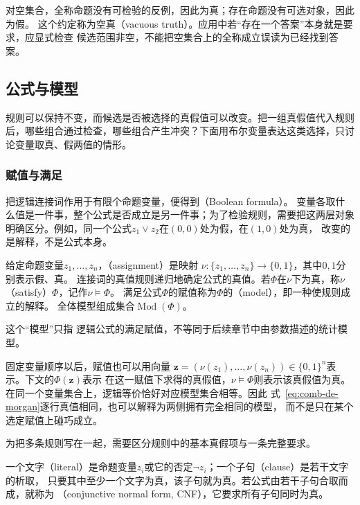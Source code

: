 对空集合，全称命题没有可检验的反例，因此为真；存在命题没有可选对象，因此为假。
这个约定称为空真（vacuous truth）。应用中若“存在一个答案”本身就是要求，应显式检查
候选范围非空，不能把空集合上的全称成立误读为已经找到答案。

\subsection{公式与模型}
\label{sec:prelim-formulas-models}

规则可以保持不变，而候选是否被选择的真假值可以改变。把一组真假值代入规则后，哪些组合通过检查，哪些组合产生冲突？下面用布尔变量表达这类选择，只讨论变量取真、假两值的情形。

\subsubsection{赋值与满足}
\label{sec:prelim-assignment-satisfaction}

把逻辑连接词作用于有限个命题变量，便得到（Boolean formula）。
变量各取什么值是一件事，整个公式是否成立是另一件事；为了检验规则，需要把这两层对象
明确区分。例如，同一个公式$z_1\lor z_2$在$(0,0)$处为假，在$(1,0)$处为真，
改变的是解释，不是公式本身。

\begin{definition}[赋值与公式的模型]
\label{def:comb-assignment-model}
给定命题变量$z_1,\ldots,z_n$，（assignment）是映射
$\nu:\{z_1,\ldots,z_n\}\to\{0,1\}$，其中$0,1$分别表示假、真。
连接词的真值规则递归地确定公式的真值。若$\Phi$在$\nu$下为真，称$\nu$
（satisfy）$\Phi$，记作$\nu\models\Phi$。
满足公式$\Phi$的赋值称为$\Phi$的（model），即一种使规则成立的解释。
全体模型组成集合$\operatorname{Mod}(\Phi)$。
\end{definition}
这个“模型”只指
逻辑公式的满足赋值，不等同于后续章节中由参数描述的统计模型。

固定变量顺序以后，赋值也可以用向量
$\bm{z}=(\nu(z_1),\ldots,\nu(z_n))\in\{0,1\}^n$表示。下文的$\Phi(\bm{z})$表示
在这一赋值下求得的真假值，$\nu\models\Phi$则表示该真假值为真。
在同一个变量集合上，逻辑等价恰好对应模型集合相等。因此
式~\eqref{eq:comb-de-morgan}逐行真值相同，也可以解释为两侧拥有完全相同的模型，
而不是只在某个选定赋值上碰巧成立。

为把多条规则写在一起，需要区分规则中的基本真假项与一条完整要求。
\begin{definition}[文字、子句与合取范式]
\label{def:comb-literals-cnf}
一个文字（literal）是命题变量$z_i$或它的否定$\neg z_i$；一个子句（clause）是若干文字的析取，
只要其中至少一个文字为真，该子句就为真。若公式由若干子句合取而成，就称为
（conjunctive normal form, CNF），它要求所有子句同时为真。
\end{definition}

